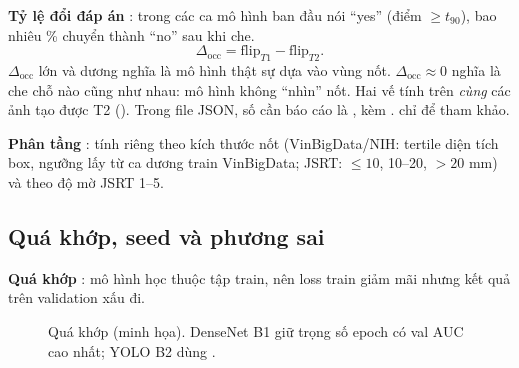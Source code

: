 \textbf{Tỷ lệ đổi đáp án} : trong các ca mô hình ban đầu nói ``yes'' (điểm $\ge t_{90}$), bao nhiêu \% chuyển thành ``no'' sau khi che.
\[
  \Delta_{\text{occ}} = \text{flip}_{T1} - \text{flip}_{T2}.
\]
$\Delta_{\text{occ}}$ lớn và dương nghĩa là mô hình thật sự dựa vào vùng nốt. $\Delta_{\text{occ}} \approx 0$ nghĩa là che chỗ nào cũng như nhau:
mô hình không ``nhìn'' nốt. Hai vế tính trên \emph{cùng} các ảnh tạo được T2 (). Trong file JSON, số cần báo cáo là ,
kèm .  chỉ để tham khảo.

\textbf{Phân tầng} : tính riêng theo kích thước nốt (VinBigData/NIH: tertile diện tích box, ngưỡng lấy từ ca dương train VinBigData;
JSRT: $\le 10$, 10--20, $> 20$ mm) và theo độ mờ JSRT 1--5.

\subsection{Quá khớp, seed và phương sai}
\label{sec:overfit}

\textbf{Quá khớp} : mô hình học thuộc tập train, nên loss train giảm mãi nhưng kết quả trên validation xấu đi.

\begin{figure}[H]
\centering
{}
\caption{Quá khớp (minh họa). DenseNet B1 giữ trọng số epoch có val AUC cao nhất; YOLO B2 dùng .}
\label{fig:overfit}
\end{figure}

